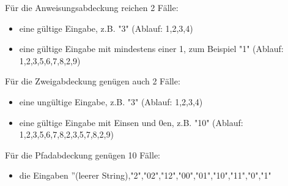 \noindent F\"ur die Anweisungsabdeckung reichen 2 F\"alle:
\begin{itemize}
    \item eine g\"ultige Eingabe, z.B. "3" (Ablauf: 1,2,3,4)
    \item eine g\"ultige Eingabe mit mindestens einer 1, zum Beispiel "1" (Ablauf: 1,2,3,5,6,7,8,2,9)
\end{itemize}
F\"ur die Zweigabdeckung gen\"ugen auch 2 F\"alle:
\begin{itemize}
    \item eine ung\"ultige Eingabe, z.B. "3" (Ablauf: 1,2,3,4)
    \item eine g\"ultige Eingabe mit Einsen und 0en, z.B. "10" (Ablauf: 1,2,3,5,6,7,8,2,3,5,7,8,2,9)
\end{itemize}
F\"ur die Pfadabdeckung gen\"ugen 10 F\"alle:
\begin{itemize}
    \item die Eingaben ''(leerer String),"2","02","12","00","01","10","11","0","1"
\end{itemize}